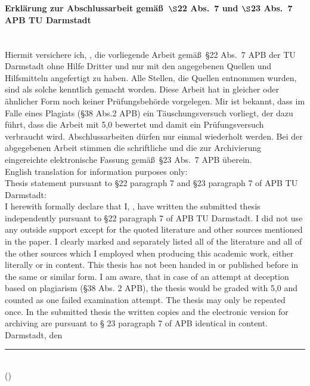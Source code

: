 \pagestyle{empty}\ \newpage

\paragraph*{Erkl\"arung zur Abschlussarbeit gem\"a\ss~$\boldsymbol{\S}$22 Abs.~7 und $\boldsymbol{\S}$23 Abs.~7 APB TU Darmstadt}\ \\[\baselineskip]
Hiermit versichere ich, \name, die vorliegende Arbeit gem\"a\ss~\S 22 Abs.~7 APB der TU Darmstadt ohne Hilfe Dritter und nur mit den angegebenen Quellen und Hilfsmitteln angefertigt zu haben. Alle Stellen, die Quellen entnommen wurden, sind als solche kenntlich gemacht worden. Diese Arbeit hat in gleicher oder \"ahnlicher Form noch keiner Pr\"ufungsbeh\"orde vorgelegen. Mir ist bekannt, dass im Falle eines Plagiats (\S38 Abs.2 APB) ein T\"auschungsversuch vorliegt, der dazu f\"uhrt, dass die Arbeit mit 5,0 bewertet und damit ein Pr\"ufungsversuch verbraucht wird. Abschlussarbeiten d\"urfen nur einmal wiederholt werden. Bei der abgegebenen Arbeit stimmen die schriftliche und die zur Archivierung eingereichte elektronische Fassung gem\"a\ss\ \S 23 Abs.~7 APB \"uberein.\\

English translation for information purposes only:\\[\baselineskip]
Thesis statement pursuant to \S22 paragraph 7 and \S23 paragraph 7 of APB TU Darmstadt:\\
I herewith formally declare that I, \name, have written the submitted thesis independently pursuant to \S22 paragraph 7 of APB TU Darmstadt. I did not use any outside support except for the quoted literature and other sources mentioned in the paper. I clearly marked and separately listed all of the literature and all of the other sources which I employed when producing this academic work, either literally or in content. This thesis has not been handed in or published before in the same or similar form.
I am aware, that in case of an attempt at deception based on plagiarism (§38 Abs. 2 APB), the thesis would be graded with 5,0 and counted as one failed examination attempt. The thesis may only be repeated once. In the submitted thesis the written copies and the electronic version for archiving are pursuant to § 23 paragraph 7 of APB identical in content.\\


Darmstadt, den \submission\\

\rule{6cm}{0.7pt}\\
(\name)
